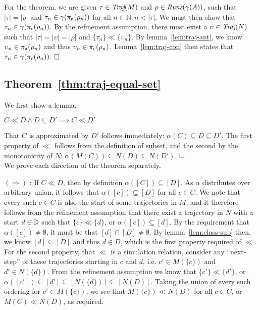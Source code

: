 For the theorem, we are given $\tau \in \operatorname{\textit{Traj}}(M)$ and $\rho \in \operatorname{\textit{Runs}}(\gamma(A))$, such that $| \tau | = | \rho |$ and $\tau_{n} \in \gamma(\operatorname{\pi_{\textrm{a}}}(\rho_{n}))$ for all $n \in \mathbb{N} : n < | \tau |$. We must then show that $\tau_{n} \in \gamma(\operatorname{\pi_{\textrm{c}}}(\rho_{n}))$. By the refinement assumption, there must exist a $\upsilon \in \operatorname{\textit{Traj}}(N)$ such that $| \tau | = | \upsilon | = | \rho |$ and $\{ \tau_{n} \} \ll \{ \upsilon_{n} \}$. By lemma~\ref{lem:traj-ant}, we know $\upsilon_{n} \in \operatorname{\pi_{\textrm{a}}}(\rho_{n})$ and thus $\upsilon_{n} \in \operatorname{\pi_{\textrm{c}}}(\rho_{n})$. Lemma~\ref{lem:traj-con} then states that $\tau_{n} \in \gamma(\operatorname{\pi_{\textrm{c}}}(\rho_{n}))$. $\qedbox$

\subsection{Theorem~\ref{thm:traj-equal-set}}

We first show a lemma.

\begin{lemma} \label{lem:ll-sub}
$C \ll D \wedge D \subseteq D' \implies C \ll D'$
\end{lemma}

That $C$ is approximated by $D'$ follows immediately: $\alpha(C) \subseteq D \subseteq D'$. The first property of $\ll$ follows from the definition of subset, and the second by the monotonicity of $N$: $\alpha(M(C)) \subseteq N(D) \subseteq N(D')$. $\qedbox$
\\

We prove each direction of the theorem separately.

$(\Rightarrow)$ : If $C \ll D$, then by definition $\alpha([C]) \subseteq [D]$. As $\alpha$ distributes over arbitrary union, it follows that $\alpha([c]) \subseteq [D]$ for all $c \in C$. We note that every such $c \in C$ is also the start of some trajectories in $M$, and it therefore follows from the refinement assumption that there exist a trajectory in $N$ with a start $d \in \mathbb{D}$ such that $\{ c \} \ll \{ d \}$, or $\alpha([c]) \subseteq [d]$. By the requirement that $\alpha([c]) \neq \emptyset$, it must be that $[d] \cap [D] \neq \emptyset$. By lemma~\ref{lem:class-sub} then, we know $[d] \subseteq [D]$ and thus $d \in D$, which is the first property required of $\ll$. For the second property, that $\ll$ is a simulation relation, consider any ``next-step'' of these trajectories starting in $c$ and $d$, i.e. $c' \in M(\{ c \})$ and $d' \in N(\{ d \})$. From the refinement assumption we know that $\{ c' \} \ll \{ d' \}$, or $\alpha([c']) \subseteq [d'] \subseteq [N(\{ d \})] \subseteq [N(D)]$. Taking the union of every such ordering for $c' \in M(\{ c \})$, we see that $M(\{ c \}) \ll N(D)$ for all $c \in C$, or $M(C) \ll N(D)$, as required.

